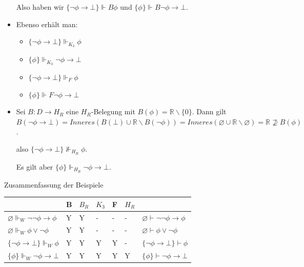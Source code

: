 \documentclass[a4paper]{article}
\begin{document}
\begin{multicols}{3}
\begin{itemize}
          Also haben wir $\{\lnot\phi\rightarrow\bot\}\Vdash B\phi$ und
          $\{\phi\}\Vdash B\lnot \phi\rightarrow\bot$.
    \item
          Ebenso erhält man:

          \begin{itemize}
            \item
                  $\{\lnot\phi\rightarrow\bot\}\Vdash_{K_3} \phi$
            \item
                  $\{\phi\}\Vdash_{K_3} \lnot\phi\rightarrow\bot$
            \item
                  $\{\lnot\phi\rightarrow\bot\}\Vdash_F\phi$
            \item
                  $\{\phi\}\Vdash F\lnot\phi\rightarrow\bot$
          \end{itemize}
    \item
          Sei $B:D\rightarrow H_R$ eine $H_R$-Belegung mit
          $B(\phi) =\mathbb{R}\backslash\{0\}$. Dann gilt
          $B(\lnot\phi\rightarrow\bot) = Inneres(B(\bot )\cup \mathbb{R}\backslash B(\lnot\phi))= Inneres(\varnothing \cup \mathbb{R}\backslash\varnothing)= \mathbb{R} \not\supseteq B(\phi)$.

          also $\{\lnot\phi\rightarrow\bot\}\not\Vdash_{H_R} \phi$.

          Es gilt aber $\{\phi\}\Vdash_{H_R}\lnot \phi\rightarrow\bot$.
  \end{itemize}

  Zusammenfassung der Beispiele

  \begin{tabular}{lllllll}
                                                       & B & $B_R$ & $K_3$ & F & $H_R$ & \\\hline
    $\varnothing\Vdash_W\lnot\lnot\phi\rightarrow\phi$ & Y & Y     & -     & - & -     &
    $\varnothing\vdash \lnot\lnot\phi\rightarrow\phi$                                    \\
    $\varnothing\Vdash_W\phi\vee\lnot\phi$             & Y & Y     & -     & - & -     &
    $\varnothing\vdash\phi\vee\lnot\phi$                                                 \\
    $\{\lnot\phi\rightarrow\bot\}\Vdash_W\phi$         & Y & Y     & Y     & Y & -     &
    $\{\lnot\phi\rightarrow\bot\}\vdash\phi$                                             \\
    $\{\phi\}\Vdash_W\lnot\phi\rightarrow\bot$         & Y & Y     & Y     & Y & Y     &
    $\{\phi\}\vdash\lnot\phi\rightarrow\bot$                                             \\
  \end{tabular}


\end{multicols}
\end{document}

